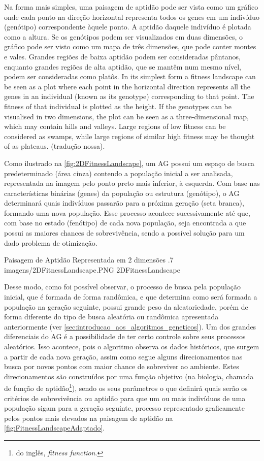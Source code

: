 \citacao
	{%
		Na forma mais simples, uma paisagem de aptidão pode ser vista como um gráfico onde cada ponto na direção horizontal representa todos os genes em um indivíduo (genótipo) correspondente àquele ponto. A aptidão daquele indivíduo é plotada como a altura. Se os genótipos podem ser visualizados em duas dimensões, o gráfico pode ser visto como um mapa de três dimensões, que pode conter montes e vales. Grandes regiões de baixa aptidão podem ser consideradas pântanos, enquanto grandes regiões de alta aptidão, que se mantêm num mesmo nível, podem ser consideradas como platôs.
	}{%
	In its simplest form a fitness landscape can be seen as a plot where each point in the horizontal direction represents all the genes in an individual (known as its genotype) corresponding to that point. The fitness of that individual is plotted as the height. If the genotypes can be visualised in two dimensions, the plot can be seen as a three-dimensional map, which may contain hills and valleys. Large regions of low fitness can be considered as swamps, while large regions of similar high fitness may be thought of as plateaus.
	}
	{\citep[pg.4]{langdon_foundations_2002}}
	{(tradução nossa).}

 Como ilustrado na \autoref{fig:2DFitnessLandscape}, um AG possui um espaço de busca predeterminado (área cinza) contendo a população inicial a ser analisada, representada na imagem pelo ponto preto mais inferior, à esquerda. Com base nas características binárias (genes) da população ou estrutura (genótipo), o AG determinará quais indivíduos passarão para a próxima geração (seta branca), formando uma nova população. Esse processo acontece sucessivamente até que, com base no estado (fenótipo) de cada nova população, seja encontrada a que possui as maiores chances de sobrevivência, sendo a possível solução para um dado problema de otimização.

\figura
	{Paisagem de Aptidão Representada em 2 dimensões}
	{.7}
	{imagens/2DFitnessLandscape.PNG}
	{2DFitnessLandscape}
	{\citet[p.5]{langdon_foundations_2002}}

Desse modo, como foi possível observar, o processo de busca pela população inicial, que é formada de forma randômica, e que determina como será formada a população na geração seguinte, possui grande peso da aleatoriedade, porém de forma diferente do tipo de busca aleatória ou randômica apresentada anteriormente (ver \autoref{sec:introducao_aos_algoritmos_geneticos}). Um dos grandes diferenciais do AG é a possibilidade de ter certo controle sobre seus processos aleatórios. Isso acontece, pois o algoritmo observa os dados históricos, que surgem a partir de cada nova geração, assim como segue alguns direcionamentos nas busca por novos pontos com maior chance de sobreviver ao ambiente. Estes direcionamentos são construídos por uma função objetivo (na biologia, chamada de função de aptidão\footnote{do inglês, \textit{fitness function}.}), sendo os seus parâmetros o que definirá quais serão os critérios de sobrevivência ou aptidão para que um ou mais indivíduos de uma população sigam para a geração seguinte, processo representado graficamente pelos pontos mais elevados na paisagem de aptidão na \autoref{fig:FitnessLandscapeAdaptado}.

